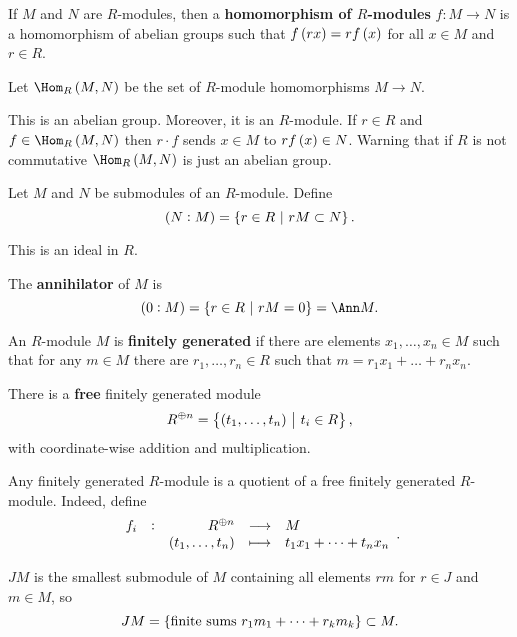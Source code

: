 \begin{definition}
If $ M $ and $ N $ are $ R $-modules, then a \textbf{homomorphism of $ R $-modules} $ f : M \to N $ is a homomorphism of abelian groups such that $ f\br{rx} = rf\br{x} $ for all $ x \in M $ and $ r \in R $.
\end{definition}

\begin{definition}
Let $ \Hom_R\br{M, N} $ be the set of $ R $-module homomorphisms $ M \to N $.
\end{definition}

This is an abelian group. Moreover, it is an $ R $-module. If $ r \in R $ and $ f \in \Hom_R\br{M, N} $ then $ r \cdot f $ sends $ x \in M $ to $ rf\br{x} \in N $. Warning that if $ R $ is not commutative $ \Hom_R\br{M, N} $ is just an abelian group.

\begin{definition}
Let $ M $ and $ N $ be submodules of an $ R $-module. Define
$$ \br{N : M} = \cbr{r \in R \st rM \subset N}. $$
\end{definition}

This is an ideal in $ R $.

\begin{example*}
The \textbf{annihilator} of $ M $ is
$$ \br{0 : M} = \cbr{r \in R \st rM = 0} = \Ann M. $$
\end{example*}

\pagebreak

\begin{definition}
An $ R $-module $ M $ is \textbf{finitely generated} if there are elements $ x_1, \dots, x_n \in M $ such that for any $ m \in M $ there are $ r_1, \dots, r_n \in R $ such that $ m = r_1x_1 + \dots + r_nx_n $.
\end{definition}

\begin{example*}
There is a \textbf{free} finitely generated module
$$ R^{\oplus n} = \cbr{\br{t_1, \dots, t_n} \st t_i \in R}, $$
with coordinate-wise addition and multiplication.
\end{example*}

\begin{remark*}
Any finitely generated $ R $-module is a quotient of a free finitely generated $ R $-module. Indeed, define
$$ \function[f_i]{R^{\oplus n}}{M}{\br{t_1, \dots, t_n}}{t_1x_1 + \dots + t_nx_n}. $$
\end{remark*}

\begin{remark*}
$ JM $ is the smallest submodule of $ M $ containing all elements $ rm $ for $ r \in J $ and $ m \in M $, so
$$ JM = \cbr{\text{finite sums} \ r_1m_1 + \dots + r_km_k} \subset M. $$
\end{remark*}

